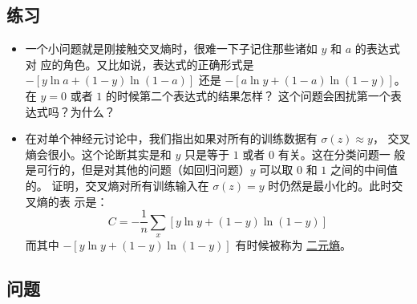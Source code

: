 \subsection*{练习}

\begin{itemize}
\item 一个小问题就是刚接触交叉熵时，很难一下子记住那些诸如 $y$ 和 $a$ 的表达式对
  应的角色。又比如说，表达式的正确形式是 $-[y \ln a + (1-y) \ln (1-a)]$ 还是
  $-[a \ln y + (1-a) \ln (1-y)]$。在 $y=0$ 或者 $1$ 的时候第二个表达式的结果怎样？
  这个问题会困扰第一个表达式吗？为什么？
\item 在对单个神经元讨论中，我们指出如果对所有的训练数据有 $\sigma(z) \approx y$，
  交叉熵会很小。这个论断其实是和 $y$ 只是等于 $1$ 或者 $0$ 有关。这在分类问题一
  般是可行的，但是对其他的问题（如回归问题）$y$ 可以取 $0$ 和 $1$ 之间的中间值的。
  证明，交叉熵对所有训练输入在 $\sigma(z) = y$ 时仍然是最小化的。此时交叉熵的表
  示是：
  \begin{equation}
    C = -\frac{1}{n} \sum_x [y \ln y+(1-y) \ln(1-y)]
    \label{eq:64}\tag{64}
  \end{equation}
  而其中 $-[y \ln y+(1-y)\ln(1-y)]$ 有时候被称为%
  \href{http://en.wikipedia.org/wiki/Binary_entropy_function}{二元熵}。
\end{itemize}

\subsection*{问题}

